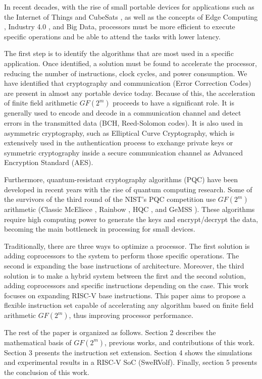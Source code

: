 In recent decades, with the rise of small portable devices for applications such as the Internet of Things \cite{5579543}
and CubeSats \cite{heidt2000cubesat}, as well as the concepts of Edge Computing \cite{7488250}, Industry 4.0 \cite{lasi2014industry}, 
and Big Data, processors must be more efficient to execute specific operations and be able to attend the tasks with lower latency.


The first step is to identify the algorithms that are most used in a specific application. 
Once identified, a solution must be found to accelerate the processor, reducing the number of instructions, 
clock cycles, and power consumption. We have identified that cryptography and communication 
(Error Correction Codes) are present in almost any portable device today. 
Because of this, the acceleration of finite field arithmetic $GF(2^m)$ proceeds to have a significant role. 
It is generally used to encode and decode in a communication channel and detect errors in the transmitted data 
(BCH, Reed-Solomon codes). It is also used in asymmetric cryptography, such as Elliptical Curve Cryptography, 
which is extensively used in the authentication process to exchange private keys or symmetric cryptography 
inside a secure communication channel as Advanced Encryption Standard (AES).


Furthermore, quantum-resistant cryptography algorithms (PQC) \cite{8791343} have been developed in recent years 
with the rise of quantum computing research. Some of the survivors of the third round of the NIST's PQC competition \cite{moody2016post} 
use $GF(2^m)$ arithmetic (Classic McEliece \cite{bernstein2017classic}, Rainbow \cite{10.1007/11496137_12}, HQC \cite{melchor2018hamming}, and GeMSS \cite{casanova2017gemss}). 
These algorithms require high computing power to generate the keys and encrypt/decrypt the data, 
becoming the main bottleneck in processing for small devices.


Traditionally, there are three ways to optimize a processor. The first solution is adding coprocessors 
to the system to perform those specific operations. The second is expanding the base instructions 
of architecture. Moreover, the third solution is to make a hybrid system between the first and 
the second solution, adding coprocessors and specific instructions depending on the case. 
This work focuses on expanding RISC-V base instructions. This paper aims to propose a flexible instruction set 
capable of accelerating any algorithm based on finite field arithmetic $GF(2^m)$, thus improving processor performance.


The rest of the paper is organized as follows. Section 2 describes the mathematical basis of $GF(2^m)$, previous works, 
and contributions of this work. Section 3 presents the instruction set extension. Section 4 shows the simulations and 
experimental results in a RISC-V SoC (SweRVolf). Finally, section 5 presents the conclusion of this work.


